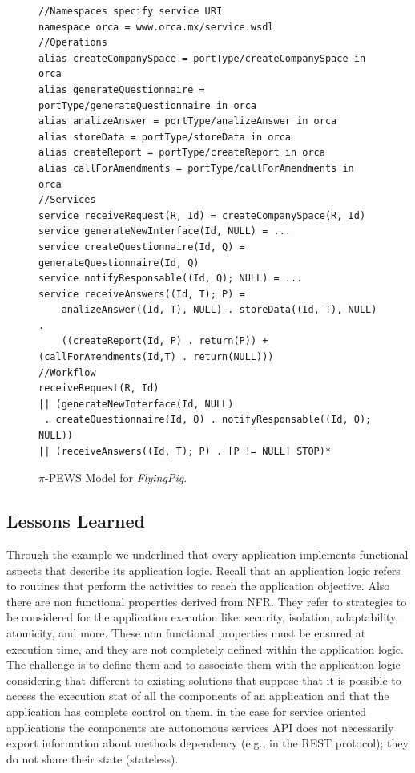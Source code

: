 \documentclass{singlecol-new}
\theoremstyle{TH}{
\newtheorem{lemma}{Lemma}
\newtheorem{theorem}[lemma]{Theorem}
\newtheorem{corrolary}[lemma]{Corrolary}
\newtheorem{conjecture}[lemma]{Conjecture}
\newtheorem{proposition}[lemma]{Proposition}
\newtheorem{claim}[lemma]{Claim}
\newtheorem{stheorem}[lemma]{Wrong Theorem}
\newtheorem{algorithm}{Algorithm}
}
\theoremstyle{THrm}{
\newtheorem{definition}{Definition}[section]
\newtheorem{question}{Question}[section]
\newtheorem{remark}{Remark}
\newtheorem{scheme}{Scheme}
}
\theoremstyle{THhit}{
\newtheorem{case}{Case}[section]
}
\theoremstyle{THhsl}{
\newtheorem{example}{Example}
}
\def\FlyingPig{\textsl{FlyingPig}\xspace}
\begin{document}
\begin{figure}[h]
\begin{scriptsize}
\begin{verbatim}
//Namespaces specify service URI
namespace orca = www.orca.mx/service.wsdl
//Operations
alias createCompanySpace = portType/createCompanySpace in orca
alias generateQuestionnaire = portType/generateQuestionnaire in orca
alias analizeAnswer = portType/analizeAnswer in orca
alias storeData = portType/storeData in orca
alias createReport = portType/createReport in orca
alias callForAmendments = portType/callForAmendments in orca
//Services
service receiveRequest(R, Id) = createCompanySpace(R, Id)
service generateNewInterface(Id, NULL) = ...
service createQuestionnaire(Id, Q) = generateQuestionnaire(Id, Q)
service notifyResponsable((Id, Q); NULL) = ...
service receiveAnswers((Id, T); P) =
	analizeAnswer((Id, T), NULL) . storeData((Id, T), NULL) . 
	((createReport(Id, P) . return(P)) + (callForAmendments(Id,T) . return(NULL)))
//Workflow
receiveRequest(R, Id)
|| (generateNewInterface(Id, NULL)
 . createQuestionnaire(Id, Q) . notifyResponsable((Id, Q); NULL))
|| (receiveAnswers((Id, T); P) . [P != NULL] STOP)*	
\end{verbatim}
\caption{$\pi$-PEWS Model for \FlyingPig.}\label{fig:piPEWSFlyingPig}
\end{scriptsize}
\end{figure}



\subsection{Lessons Learned}

Through the example we underlined that every application implements functional aspects that describe its application logic.
Recall that an application logic refers to routines that perform the activities to reach the application objective.
Also there are non functional properties derived from NFR. They refer to strategies to be considered for the application execution like: security, isolation, adaptability, atomicity, and more.
These non functional properties must be ensured at execution time, and they are not completely defined within the application logic.
%
The challenge is to define them and to associate them with the application logic considering that different to existing solutions that suppose that it is possible to access the execution stat of all the components  of an application and that the application has complete control on them, in the case for service oriented applications  the components are autonomous services
API does not necessarily export information about methods dependency (e.g., in the REST protocol);
they do not share their state (stateless).
\end{document}
